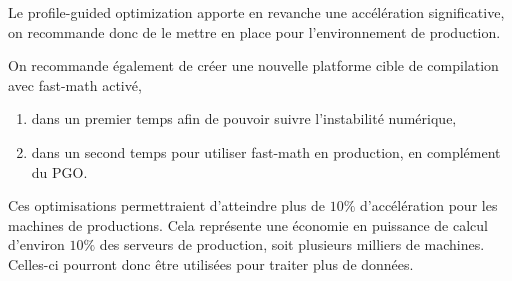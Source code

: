 \documentclass[a4paper]{report}
\begin{document}
Le profile-guided optimization apporte en revanche une accélération significative, on recommande donc de le mettre en place pour l'environnement de production.

On recommande également de créer une nouvelle platforme cible de compilation avec fast-math activé,
\begin{enumerate}
    \item dans un premier temps afin de pouvoir suivre l'instabilité numérique,
    \item dans un second temps pour utiliser fast-math en production, en complément du PGO.
\end{enumerate}

Ces optimisations permettraient d'atteindre plus de $10\%$ d'accélération pour les machines de productions.
Cela représente une économie en puissance de calcul d'environ $10\%$ des serveurs de production, soit plusieurs milliers de machines.
Celles-ci pourront donc être utilisées pour traiter plus de données.


\printbibliography
\end{document}
